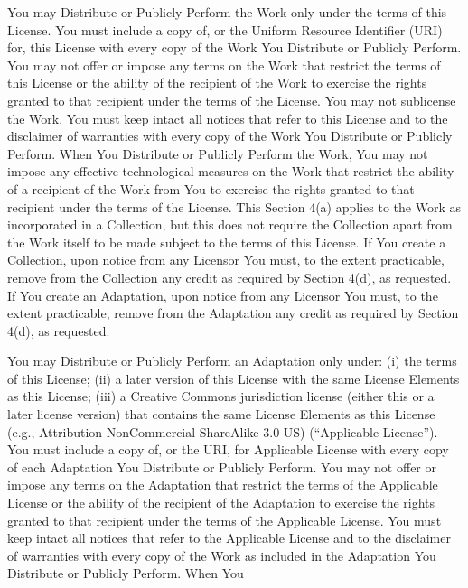 \begin{doclicense@enumerate}
\item You may Distribute or Publicly Perform the Work only
under the terms of this License. You must include a copy
of, or the Uniform Resource Identifier (URI) for, this
License with every copy of the Work You Distribute or
Publicly Perform. You may not offer or impose any terms
on the Work that restrict the terms of this License or
the ability of the recipient of the Work to exercise the
rights granted to that recipient under the terms of the
License. You may not sublicense the Work. You must keep
intact all notices that refer to this License and to the
disclaimer of warranties with every copy of the Work You
Distribute or Publicly Perform. When You Distribute or
Publicly Perform the Work, You may not impose any
effective technological measures on the Work that
restrict the ability of a recipient of the Work from You
 to exercise the rights granted to that recipient under
the terms of the License. This Section 4(a) applies to
the Work as incorporated in a Collection, but this does
not require the Collection apart from the Work itself to
be made subject to the terms of this License. If You
create a Collection, upon notice from any Licensor You
must, to the extent practicable, remove from the
Collection any credit as required by Section 4(d), as
requested. If You create an Adaptation, upon notice from
any Licensor You must, to the extent practicable, remove
from the Adaptation any credit as required by Section
4(d), as requested.
\item You may Distribute or Publicly Perform an Adaptation
only under: (i) the terms of this License; (ii) a later
version of this License with the same License Elements as
this License; (iii) a Creative Commons jurisdiction
license (either this or a later license version) that
contains the same License Elements as this License (e.g.,
Attribution-NonCommercial-ShareAlike 3.0 US) (``Applicable
License''). You must include a copy of, or the URI, for
Applicable License with every copy of each Adaptation You
Distribute or Publicly Perform. You may not offer or
impose any terms on the Adaptation that restrict the
terms of the Applicable License or the ability of the
recipient of the Adaptation to exercise the rights
granted to that recipient under the terms of the
Applicable License. You must keep intact all notices that
refer to the Applicable License and to the disclaimer of
warranties with every copy of the Work as included in the
Adaptation You Distribute or Publicly Perform. When You

\end{doclicense@enumerate}

